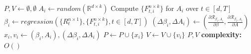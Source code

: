 \begin{algorithm}[H]
\caption{$\text{initialize\_position\_and\_velocity}(N)$}
\label{mopso:initilize_position_and_velocity}
\begin{algorithmic}[1]
\State $P, V \gets \emptyset, \emptyset$
    \State $A_i \gets random(\mathbb{R}^{d\times k})$
    \State Compute $\{F^{n\times k}_{t,i}\}$ for $A_i$ over $t\in [d,T]$
    \State $\beta_i \gets regression(\{R^{n\times 1}_{t}\},\{F^{n\times k}_{t,i}\}, t\in [d,T])$
    \State $(\Delta \beta_i,\Delta A_i) \gets (\frac{\partial \mathcal{R}_{\beta_i, A_{i}}}{\partial \beta},\frac{\partial \mathcal{R}_{\beta_i, A_{i}}}{\partial A})$
    \State $x_i, v_i\gets (\beta_i,A_i), (\Delta \beta_i,\Delta A_i)$
    \State $P\gets P \cup \{x_i\}$
    \State $V\gets V \cup \{v_i\}$
\EndFor
\State \Return $P, V$
\State \textbf{complexity: } $O()$
\end{algorithmic}
\end{algorithm}


